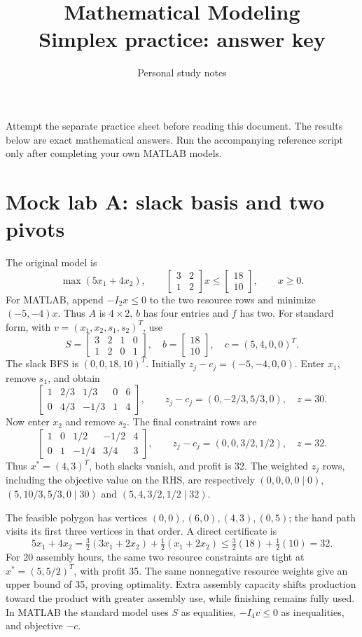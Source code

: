 \documentclass[11pt,a4paper]{article}
\title{\textbf{Mathematical Modeling}\\[2mm]\large Simplex practice: answer key}
\author{Personal study notes}
\date{}
\begin{document}
\maketitle
Attempt the separate practice sheet before reading this document. The results
below are exact mathematical answers. Run the accompanying reference script
only after completing your own MATLAB models.

\section{Mock lab A: slack basis and two pivots}
The original model is
\[
  \max(5x_1+4x_2),\qquad
  \begin{bmatrix}3&2\\1&2\end{bmatrix}x\leq
  \begin{bmatrix}18\\10\end{bmatrix},\qquad x\geq0.
\]
For MATLAB, append $-I_2x\leq0$ to the two resource rows and minimize
$(-5,-4)x$. Thus $A$ is $4\times2$, $b$ has four entries and $f$ has two.
For standard form, with $v=(x_1,x_2,s_1,s_2)^T$, use
\[
  S=\begin{bmatrix}3&2&1&0\\1&2&0&1\end{bmatrix},\quad
  b=\begin{bmatrix}18\\10\end{bmatrix},\quad c=(5,4,0,0)^T.
\]
The slack BFS is $(0,0,18,10)^T$. Initially $z_j-c_j=(-5,-4,0,0)$.
Enter $x_1$, remove $s_1$, and obtain
\[
  \left[\begin{array}{rrrr|r}
      1&2/3&1/3&0&6\\0&4/3&-1/3&1&4
    \end{array}\right],\qquad
  z_j-c_j=(0,-2/3,5/3,0),\quad z=30.
\]
Now enter $x_2$ and remove $s_2$. The final constraint rows are
\[
  \left[\begin{array}{rrrr|r}
      1&0&1/2&-1/2&4\\0&1&-1/4&3/4&3
    \end{array}\right],\qquad
  z_j-c_j=(0,0,3/2,1/2),\quad z=32.
\]
Thus $x^*=(4,3)^T$, both slacks vanish, and profit is 32. The weighted
$z_j$ rows, including the objective value on the RHS, are respectively
$(0,0,0,0\mid0)$, $(5,10/3,5/3,0\mid30)$ and
$(5,4,3/2,1/2\mid32)$.

The feasible polygon has vertices $(0,0),(6,0),(4,3),(0,5)$; the hand path
visits its first three vertices in that order. A direct certificate is
\[
  5x_1+4x_2=\tfrac32(3x_1+2x_2)+\tfrac12(x_1+2x_2)
  \leq\tfrac32(18)+\tfrac12(10)=32.
\]
For 20 assembly hours, the same two resource constraints are tight at
$x^*=(5,5/2)^T$, with profit 35. The same nonnegative resource weights
give an upper bound of 35, proving optimality. Extra assembly capacity shifts
production toward the product with greater assembly use, while finishing remains
fully used. In MATLAB the standard model uses $S$ as equalities,
$-I_4v\leq0$ as inequalities, and objective $-c$.
\end{document}
